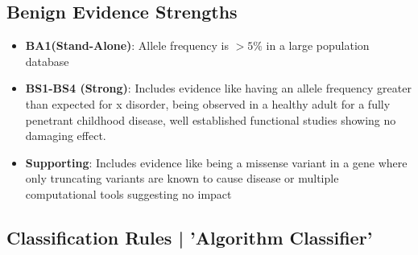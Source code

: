 \documentclass[../main.tex]{subfiles}
\begin{document}
\subsection{Benign Evidence Strengths}
\begin{itemize}
    \item \textbf{BA1(Stand-Alone)}: Allele frequency is $>5\%$ in a large population database
    \item \textbf{BS1-BS4 (Strong)}: Includes evidence like having an allele frequency greater than expected for x disorder, being observed in a healthy adult for a fully penetrant childhood disease, well established functional studies showing no damaging effect. 
    \item \textbf{Supporting}: Includes evidence like being a missense variant in a gene where only truncating variants are known to cause disease or multiple computational tools suggesting no impact
\end{itemize}

\subsection{Classification Rules | 'Algorithm Classifier'}
\end{document}
